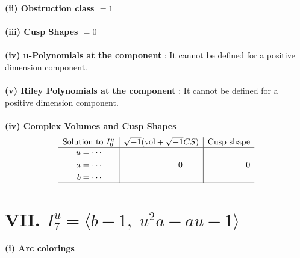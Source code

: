 \documentclass[1p]{elsarticle_modified}
\theoremstyle{definition}
\newcommand{\I}{\sqrt{-1}}
\begin{document}
\flushleft \textbf{(ii) Obstruction class $= 1$}\\~\\
\flushleft \textbf{(iii) Cusp Shapes $= 0$}\\~\\
\flushleft \textbf{(iv) u-Polynomials at the component} : It cannot be defined for a positive dimension component.\\~\\
\flushleft \textbf{(v) Riley Polynomials at the component} : It cannot be defined for a positive dimension component.\\~\\
\newpage\flushleft \textbf{(iv) Complex Volumes and Cusp Shapes}
$$\begin{array}{c|c|c} 
\text{Solution to }I^u_{6}& \I (\text{vol} + \sqrt{-1}CS) & \text{Cusp shape}\\
 \hline 
\begin{aligned}
u &= \cdots \\
a &= \cdots \\
b &= \cdots\end{aligned}
 & \phantom{-0.000000 } 0 & \phantom{-0.000000 } 0\\
 \hline 
 \end{array}
$$\newpage\renewcommand{\arraystretch}{1}
\centering \section*{VII. $I^u_{7}= \langle b-1,\;u^2 a- a u-1 \rangle$}
\flushleft \textbf{(i) Arc colorings}\\
\end{document}
